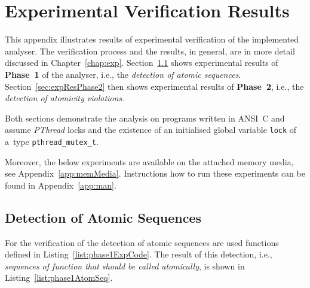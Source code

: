 

\chapter{Experimental Verification Results}
\label{app:expRes}

This appendix illustrates results of experimental verification of
the implemented analyser. The verification process and the results, in
general, are in more detail discussed in Chapter~\ref{chap:exp}.
Section~\ref{sec:expResPhase1} shows experimental results of
\textbf{Phase~1} of the analyser, i.e., the \emph{detection of atomic
sequences}. Section~\ref{sec:expResPhase2} then shows experimental results
of \textbf{Phase~2}, i.e., the \emph{detection of atomicity violations}.

Both sections demonstrate the analysis on programs written in ANSI~C
and assume \emph{PThread} locks and the existence of an initialised
global variable \texttt{lock} of a~type \texttt{pthread\_mutex\_t}.

Moreover, the below experiments are available on the attached memory media,
see Appendix~\ref{app:memMedia}. Instructions how to run these
experiments can be found in Appendix~\ref{app:man}.


\section{Detection of Atomic Sequences}
\label{sec:expResPhase1}

For the verification of the detection of atomic sequences are used
functions defined in Listing~\ref{list:phase1ExpCode}. The result of
this detection, i.e., \emph{sequences of function that should be called
atomically}, is shown in Listing~\ref{list:phase1AtomSeq}.

